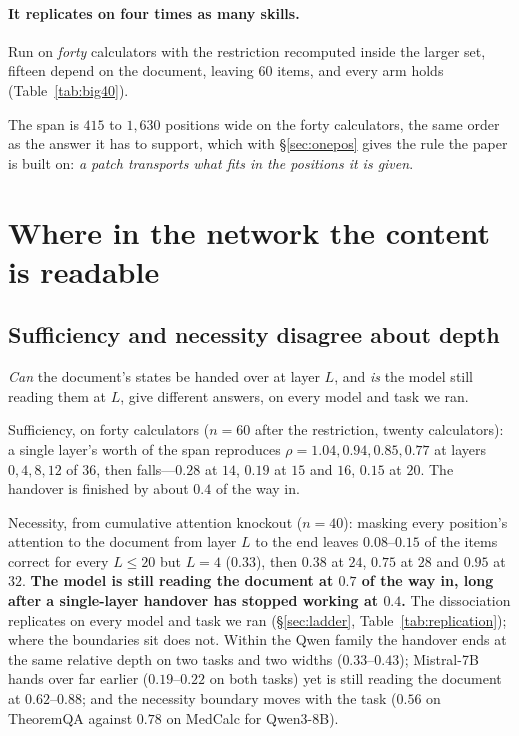 \documentclass{article}
\begin{document}
\paragraph{It replicates on four times as many skills.} Run on \emph{forty}
calculators with the restriction recomputed inside the larger set, fifteen
depend on the document, leaving $60$ items, and every arm holds
(Table~\ref{tab:big40}).

\begin{table}[t]
\caption{The span battery on forty calculators. The restricted split---the
fifteen calculators a wrong document never rescues---is recomputed inside this
set, so no number is inherited from the ten-calculator version. Intervals are
bootstrapped over calculators. The last two rows are the instrument: writing the
receiver's own states back into it, and not patching at all.}
\label{tab:big40}
\centering
\small

\end{table}

The span is $415$ to $1{,}630$ positions wide on the forty calculators, the same order as the answer it has
to support, which with \S\ref{sec:onepos} gives the rule the paper is built on:
\emph{a patch transports what fits in the positions it is given}.

\section{Where in the network the content is readable}
\label{sec:where}

\subsection{Sufficiency and necessity disagree about depth}
\label{sec:depth}

\emph{Can} the document's states be handed over at layer $L$, and \emph{is} the
model still reading them at $L$, give different answers, on every model and
task we ran.

Sufficiency, on forty calculators ($n=60$ after the restriction, twenty
calculators): a single layer's worth of the span reproduces
$\rho = 1.04, 0.94, 0.85, 0.77$ at layers $0, 4, 8, 12$ of $36$, then
falls---$0.28$ at $14$, $0.19$ at $15$ and $16$, $0.15$ at $20$. The handover is
finished by about $0.4$ of the way in.

Necessity, from cumulative attention knockout ($n=40$): masking every position's
attention to the document from layer $L$ to the end leaves $0.08$--$0.15$ of the
items correct for every $L \le 20$ but $L=4$ ($0.33$), then $0.38$ at $24$, $0.75$ at $28$ and
$0.95$ at $32$. \textbf{The model is still reading the document at $0.7$ of the
way in, long after a single-layer handover has stopped working at $0.4$.} The
dissociation replicates on every model and task we ran (\S\ref{sec:ladder},
Table~\ref{tab:replication}); where the boundaries sit does not. Within the Qwen
family the handover ends at the same relative depth on two tasks and two widths
($0.33$--$0.43$); Mistral-7B hands over far earlier ($0.19$--$0.22$ on both
tasks) yet is still reading the document at $0.62$--$0.88$; and the necessity
boundary moves with the task ($0.56$ on TheoremQA against $0.78$ on MedCalc for
Qwen3-8B).
\end{document}
